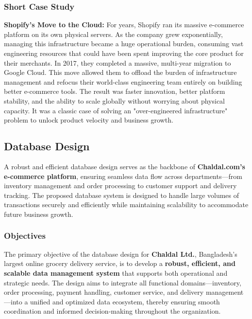 \documentclass[12pt,a4paper]{article}
\begin{document}
\subsubsection{Short Case Study}

\textbf{Shopify's Move to the Cloud:} For years, Shopify ran its massive e-commerce platform on its own physical servers. As the company grew exponentially, managing this infrastructure became a huge operational burden, consuming vast engineering resources that could have been spent improving the core product for their merchants. In 2017, they completed a massive, multi-year migration to Google Cloud. This move allowed them to offload the burden of infrastructure management and refocus their world-class engineering team entirely on building better e-commerce tools. The result was faster innovation, better platform stability, and the ability to scale globally without worrying about physical capacity. It was a classic case of solving an "over-engineered infrastructure" problem to unlock product velocity and business growth.


\subsection{Database Design}

A robust and efficient database design serves as the backbone of \textbf{Chaldal.com’s e-commerce platform}, ensuring seamless data flow across departments—from inventory management and order processing to customer support and delivery tracking. The proposed database system is designed to handle large volumes of transactions securely and efficiently while maintaining scalability to accommodate future business growth.

\subsubsection{Objectives}

The primary objective of the database design for \textbf{Chaldal Ltd.}, Bangladesh’s largest online grocery delivery service, is to develop a \textbf{robust, efficient, and scalable data management system} that supports both operational and strategic needs. The design aims to integrate all functional domains—inventory, order processing, payment handling, customer service, and delivery management—into a unified and optimized data ecosystem, thereby ensuring smooth coordination and informed decision-making throughout the organization.
\end{document}
